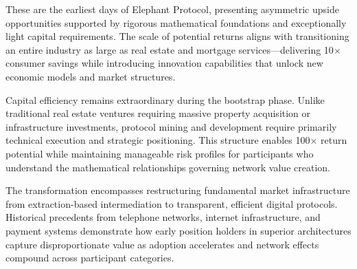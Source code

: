 These are the earliest days of Elephant Protocol, presenting asymmetric upside opportunities supported by rigorous mathematical foundations and exceptionally light capital requirements. The scale of potential returns aligns with transitioning an entire industry as large as real estate and mortgage services---delivering 10\(\times\) consumer savings while introducing innovation capabilities that unlock new economic models and market structures.

Capital efficiency remains extraordinary during the bootstrap phase. Unlike traditional real estate ventures requiring massive property acquisition or infrastructure investments, protocol mining and development require primarily technical execution and strategic positioning. This structure enables 100\(\times\) return potential while maintaining manageable risk profiles for participants who understand the mathematical relationships governing network value creation.

The transformation encompasses restructuring fundamental market infrastructure from extraction-based intermediation to transparent, efficient digital protocols. Historical precedents from telephone networks, internet infrastructure, and payment systems demonstrate how early position holders in superior architectures capture disproportionate value as adoption accelerates and network effects compound across participant categories.